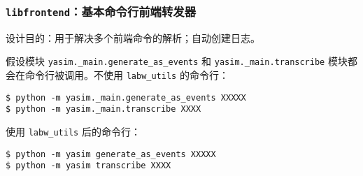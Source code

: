 \documentclass[pdf,9pt]{beamer}
\newcommand{\lu}{\texttt{labw\_utils}}
\begin{document}
    \begin{frame}
        \subsectionpage
    \end{frame}

    \subsubsection{\texttt{libfrontend}：基本命令行前端转发器}

    \begin{frame}[fragile]{\subsubsecname}

        设计目的：用于解决多个前端命令的解析；自动创建日志。

        假设模块 \Verb|yasim._main.generate_as_events| 和 \Verb|yasim._main.transcribe| 模块都会在命令行被调用。不使用 \lu{} 的命令行：

        \begin{verbatim}
$ python -m yasim._main.generate_as_events XXXXX
$ python -m yasim._main.transcribe XXXX
        \end{verbatim}

        使用 \lu{} 后的命令行：

        \begin{verbatim}
$ python -m yasim generate_as_events XXXXX
$ python -m yasim transcribe XXXX
        \end{verbatim}

    \end{frame}
\end{document}
